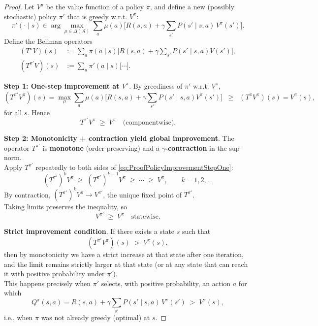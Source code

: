 \documentclass[
]{book}
\theoremstyle{definition}
\theoremstyle{definition}
\theoremstyle{definition}
\theoremstyle{definition}
\theoremstyle{remark}
\begin{document}
\begin{proof}
Let \(V^{\pi}\) be the value function of a policy \(\pi\), and define a new (possibly stochastic) policy \(\pi'\) that is greedy w.r.t. \(V^{\pi}\):
\[
\pi'(\cdot \mid s) \in \arg\max_{\mu \in \Delta(\mathcal{A})}
\sum_{a}\mu(a)\Big[ R(s,a) + \gamma \sum_{s'} P(s'\mid s,a)\, V^{\pi}(s')\Big].
\]
Define the Bellman operators
\begin{align*}
(T^{\pi}V)(s) & := \sum_a \pi(a\mid s)\Big[R(s,a)+\gamma\sum_{s'}P(s'\mid s,a)V(s')\Big],\\
(T^{\pi'}V)(s) & := \sum_a \pi'(a\mid s)\Big[\cdots\Big].
\end{align*}

\textbf{Step 1: One-step improvement at \(V^{\pi}\)}.
By greediness of \(\pi'\) w.r.t. \(V^{\pi}\),
\[
(T^{\pi'} V^{\pi})(s)
= \max_{\mu}\sum_a \mu(a)\Big[R(s,a)+\gamma\sum_{s'}P(s'\mid s,a)V^{\pi}(s')\Big]
\;\;\ge\;\; (T^{\pi} V^{\pi})(s) = V^{\pi}(s),
\]
for all \(s\). Hence
\begin{equation}
T^{\pi'} V^{\pi} \;\ge\; V^{\pi}\quad\text{(componentwise).}
\label{eq:ProofPolicyImprovementStepOne}
\end{equation}

\textbf{Step 2: Monotonicity + contraction yield global improvement}.
The operator \(T^{\pi'}\) is \textbf{monotone} (order-preserving) and a \textbf{\(\gamma\)-contraction} in the sup-norm.\\
Apply \(T^{\pi'}\) repeatedly to both sides of \eqref{eq:ProofPolicyImprovementStepOne}:
\[
(T^{\pi'})^k V^{\pi} \;\ge\; (T^{\pi'})^{k-1} V^{\pi} \;\ge\; \cdots \;\ge\; V^{\pi},\qquad k=1,2,\dots
\]
By contraction, \((T^{\pi'})^k V^{\pi} \to V^{\pi'}\), the unique fixed point of \(T^{\pi'}\).\\
Taking limits preserves the inequality, so
\[
V^{\pi'} \;\ge\; V^{\pi}\quad\text{statewise.}
\]

\textbf{Strict improvement condition}.
If there exists a state \(s\) such that
\[
(T^{\pi'} V^{\pi})(s) \;>\; V^{\pi}(s),
\]
then by monotonicity we have a strict increase at that state after one iteration, and the limit remains strictly larger at that state (or at any state that can reach it with positive probability under \(\pi'\)).\\
This happens precisely when \(\pi'\) selects, with positive probability, an action \(a\) for which
\[
Q^{\pi}(s,a)=R(s,a) + \gamma \sum_{s'} P(s'\mid s,a)\, V^{\pi}(s') \;>\; V^{\pi}(s),
\]
i.e., when \(\pi\) was not already greedy (optimal) at \(s\).
\end{proof}
\end{document}
